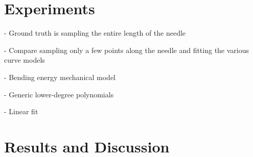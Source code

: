 \section{Experiments}
- Ground truth is sampling the entire length of the needle

- Compare sampling only a few points along the needle and fitting the various curve models

- Bending energy mechanical model

- Generic lower-degree polynomials

- Linear fit

\section{Results and Discussion}


    

    

    







